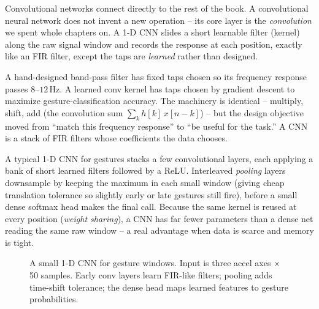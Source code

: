 Convolutional networks connect directly to the rest of the book. A convolutional
neural network does not invent a new operation -- its core layer is the \emph{convolution}
we spent whole chapters on. A 1-D CNN slides a short learnable filter (kernel) along the
raw signal window and records the response at each position, exactly like an FIR filter,
except the taps are \emph{learned} rather than designed.

\begin{happeningbox}
A hand-designed band-pass filter has fixed taps chosen so its frequency response passes
$8$--$12$\,Hz. A learned conv kernel has taps chosen by gradient descent to maximize
gesture-classification accuracy. The machinery is identical -- multiply, shift, add (the
convolution sum $\sum_k h[k]\,x[n-k]$) -- but the design objective moved from ``match this
frequency response'' to ``be useful for the task.'' A CNN is a stack of FIR filters whose
coefficients the data chooses.
\end{happeningbox}

A typical 1-D CNN for gestures stacks a few convolutional layers, each applying a bank of short
learned filters followed by a ReLU. Interleaved \emph{pooling} layers downsample by
keeping the maximum in each small window (giving cheap translation tolerance so slightly early or late gestures still fire), before a small dense softmax head makes the final call. Because the
same kernel is reused at every position (\emph{weight sharing}), a CNN has far fewer
parameters than a dense net reading the same raw window -- a real advantage when data is
scarce and memory is tight.

\begin{figure}[H]
\centering
{}
\caption{A small 1-D CNN for gesture windows. Input is three accel axes $\times$ 50
samples. Early conv layers learn FIR-like filters; pooling adds time-shift tolerance;
the dense head maps learned features to gesture probabilities.}
\label{ch39:fig-cnn}
\end{figure}

